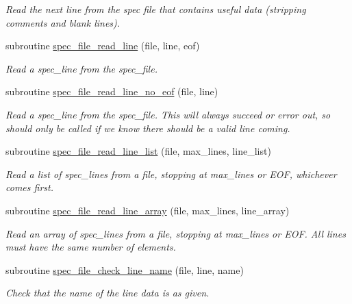 \begin{DoxyCompactItemize}
\begin{DoxyCompactList}\small\item\em Read the next line from the spec file that contains useful data (stripping comments and blank lines). \end{DoxyCompactList}\item 
subroutine \mbox{\hyperlink{namespacepmc__spec__file_ae544104f5a2984285c893055469e264c}{spec\+\_\+file\+\_\+read\+\_\+line}} (file, line, eof)
\begin{DoxyCompactList}\small\item\em Read a spec\+\_\+line from the spec\+\_\+file. \end{DoxyCompactList}\item 
subroutine \mbox{\hyperlink{namespacepmc__spec__file_a859907e4e40a0d2451a4d6d2c740f956}{spec\+\_\+file\+\_\+read\+\_\+line\+\_\+no\+\_\+eof}} (file, line)
\begin{DoxyCompactList}\small\item\em Read a spec\+\_\+line from the spec\+\_\+file. This will always succeed or error out, so should only be called if we know there should be a valid line coming. \end{DoxyCompactList}\item 
subroutine \mbox{\hyperlink{namespacepmc__spec__file_aaf63e06c4ae6bef1b2417aadf81ae413}{spec\+\_\+file\+\_\+read\+\_\+line\+\_\+list}} (file, max\+\_\+lines, line\+\_\+list)
\begin{DoxyCompactList}\small\item\em Read a list of spec\+\_\+lines from a file, stopping at max\+\_\+lines or E\+OF, whichever comes first. \end{DoxyCompactList}\item 
subroutine \mbox{\hyperlink{namespacepmc__spec__file_a68af556f3f33d455a7ff86d8fff1c660}{spec\+\_\+file\+\_\+read\+\_\+line\+\_\+array}} (file, max\+\_\+lines, line\+\_\+array)
\begin{DoxyCompactList}\small\item\em Read an array of spec\+\_\+lines from a file, stopping at max\+\_\+lines or E\+OF. All lines must have the same number of elements. \end{DoxyCompactList}\item 
subroutine \mbox{\hyperlink{namespacepmc__spec__file_a4f11fc0e28f7b8831efcb65ef879bfc4}{spec\+\_\+file\+\_\+check\+\_\+line\+\_\+name}} (file, line, name)
\begin{DoxyCompactList}\small\item\em Check that the name of the line data is as given. \end{DoxyCompactList}\item 

\end{DoxyCompactItemize}
